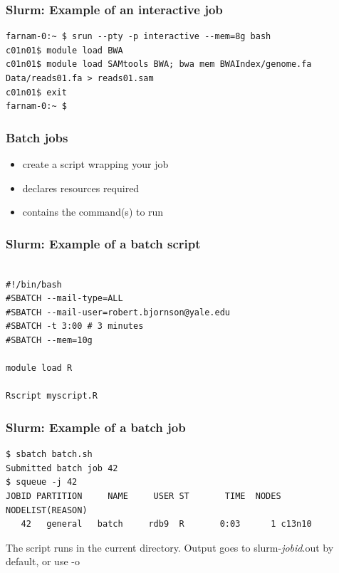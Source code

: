 \documentclass[10pt]{beamer}
\newcommand\smallfont{\fontsize{8pt}{7.2}\selectfont}
\newcommand\regfont{\fontsize{10pt}{7.2}\selectfont}
\begin{document}
\begin{frame}[fragile]
\frametitle{Slurm: Example of an interactive job}
\begin{verbatim}
farnam-0:~ $ srun --pty -p interactive --mem=8g bash
c01n01$ module load BWA
c01n01$ module load SAMtools BWA; bwa mem BWAIndex/genome.fa Data/reads01.fa > reads01.sam
c01n01$ exit
farnam-0:~ $
\end{verbatim}
\end{frame}

\begin{frame}[fragile]
\frametitle{Batch jobs}
\begin{itemize}
\item create a script wrapping your job
\item declares resources required
\item contains the command(s) to run
\end{itemize}

\end{frame}

\begin{frame}[fragile]
\frametitle{Slurm: Example of a batch script}

\begin{block}{}
\begin{verbatim}

#!/bin/bash
#SBATCH --mail-type=ALL
#SBATCH --mail-user=robert.bjornson@yale.edu
#SBATCH -t 3:00 # 3 minutes
#SBATCH --mem=10g

module load R

Rscript myscript.R
\end{verbatim}
\end{block}{}
\end{frame}

\begin{frame}[fragile]
\frametitle{Slurm: Example of a batch job}
\smallfont
\begin{verbatim}
$ sbatch batch.sh
Submitted batch job 42
$ squeue -j 42
JOBID PARTITION     NAME     USER ST       TIME  NODES NODELIST(REASON)
   42   general   batch     rdb9  R       0:03      1 c13n10
\end{verbatim}
\vskip14pt
\regfont
The script runs in the current directory.  
Output goes to slurm-\textit{jobid}.out by default, or use -o
\end{frame}
\end{document}

